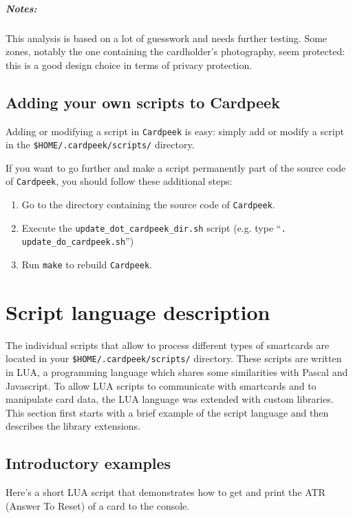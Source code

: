 \documentclass[11pt]{report}
\begin{document}
\paragraph{Notes:}
This analysis is based on a lot of guesswork and needs further testing.
Some zones, notably the one containing the cardholder's photography, seem protected: this is a good design choice in terms of privacy protection.

\section{Adding your own scripts to Cardpeek}
Adding or modifying a script in \texttt{Cardpeek} is easy: simply add or modify a script in the \texttt{\$HOME/.cardpeek/scripts/} directory.

If you want to go further and make a script permanently part of the source code of \texttt{Cardpeek}, you should follow these additional steps:
\begin{enumerate}
\item{Go to the directory containing the source code of \texttt{Cardpeek}.}
\item{Execute the \texttt{update\_dot\_cardpeek\_dir.sh} script (e.g. type ``\texttt{. update\_do\_cardpeek.sh}'')}
\item{Run \texttt{make} to rebuild \texttt{Cardpeek}.}
\end{enumerate}

\chapter{Script language description}

The individual scripts that allow to process different types of smartcards are located in your \texttt{\$HOME/.cardpeek/scripts/} directory.
These scripts are written in LUA, a programming language which shares some similarities with Pascal and Javascript.
To allow LUA scripts to communicate with smartcards and to manipulate card data, the LUA language was extended with custom libraries.
This section first starts with a brief example of the script language and then describes the library extensions.

\section{Introductory examples}

Here's a short LUA script that demonstrates how to get and print the ATR (Answer To Reset) of a card to the console.
\end{document}
